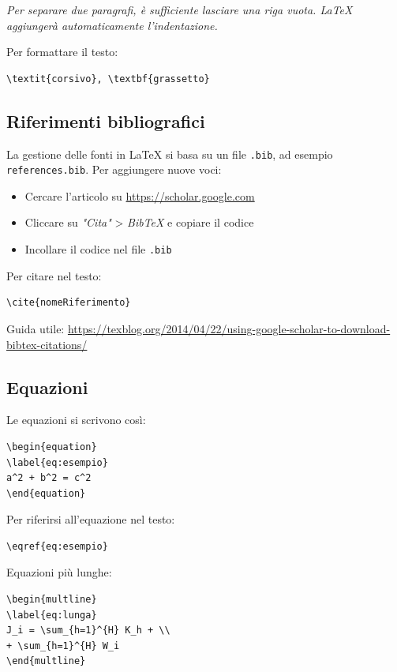 \documentclass{00-settings/document}
\begin{document}
\textit{Per separare due paragrafi, è sufficiente lasciare una riga vuota. \LaTeX{} aggiungerà automaticamente l'indentazione.}

Per formattare il testo:
\begin{verbatim}
\textit{corsivo}, \textbf{grassetto}
\end{verbatim}

\subsection{Riferimenti bibliografici}
La gestione delle fonti in \LaTeX{} si basa su un file \texttt{.bib}, ad esempio \texttt{references.bib}. Per aggiungere nuove voci:

\begin{itemize}
    \item Cercare l'articolo su \url{https://scholar.google.com}
    \item Cliccare su \textit{"Cita"} > \textit{BibTeX} e copiare il codice
    \item Incollare il codice nel file \texttt{.bib}
\end{itemize}

Per citare nel testo:
\begin{verbatim}
\cite{nomeRiferimento}
\end{verbatim}

Guida utile: \url{https://texblog.org/2014/04/22/using-google-scholar-to-download-bibtex-citations/}

\subsection{Equazioni}
Le equazioni si scrivono così:
\begin{verbatim}
\begin{equation}
\label{eq:esempio}
a^2 + b^2 = c^2
\end{equation}
\end{verbatim}

Per riferirsi all'equazione nel testo:
\begin{verbatim}
\eqref{eq:esempio}
\end{verbatim}

Equazioni più lunghe:
\begin{verbatim}
\begin{multline}
\label{eq:lunga}
J_i = \sum_{h=1}^{H} K_h + \\
+ \sum_{h=1}^{H} W_i
\end{multline}
\end{verbatim}
\end{document}
